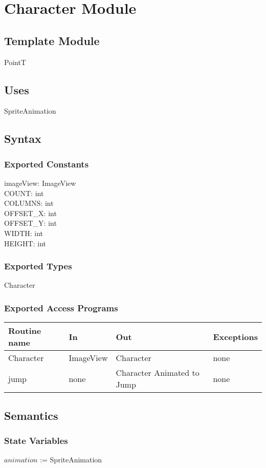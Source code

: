 \documentclass[12pt, titlepage]{article}
\begin{document}
\newpage
\section {Character Module}
\subsection{Template Module}
PointT
\subsection {Uses}
SpriteAnimation
\subsection {Syntax}
\subsubsection{Exported Constants}
imageView: ImageView\\
COUNT: int\\
COLUMNS: int\\
OFFSET\_X: int\\
OFFSET\_Y: int\\
WIDTH: int\\
HEIGHT: int\\
\subsubsection {Exported Types}
Character
\subsubsection {Exported Access Programs}
\begin{tabular}{| l | l | l | l |}
\hline
\textbf{Routine name} & \textbf{In} & \textbf{Out} & \textbf{Exceptions}\\
\hline
Character & ImageView & Character & none\\
\hline
jump & none & Character Animated to Jump & none\\
\hline
\end{tabular}
\subsection {Semantics}
\subsubsection {State Variables}
$animation$ := SpriteAnimation
\end{document}
